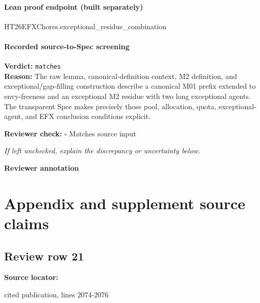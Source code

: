 \documentclass[10pt]{article}
\newcommand{\reviewerbox}{%
  \par\noindent\fbox{\parbox{0.96\linewidth}{\rule{0pt}{0.38in}}}\par
}
\newcommand{\reviewmatch}[1]{%
  \par\noindent\textbf{Reviewer check:} $\square$\; #1\par
  \noindent\emph{If left unchecked, explain the discrepancy or uncertainty below.}\par
}
\begin{document}
\paragraph{Lean proof endpoint (built separately)}\begin{ReviewVerbatim}
HT26EFXChores.exceptional_residue_combination
\end{ReviewVerbatim}

\paragraph{Recorded source-to-Spec screening}
\textbf{Verdict:} \texttt{matches}
\\
\textbf{Reason:} The raw lemma, canonical-definition context, M2 definition, and exceptional/gap-filling construction describe a canonical M01 prefix extended to envy-freeness and an exceptional M2 residue with two long exceptional agents. The transparent Spec makes precisely those pool, allocation, quota, exceptional-agent, and EFX conclusion conditions explicit.
\reviewmatch{Matches source input}
\noindent\textbf{Reviewer annotation}\par
\reviewerbox
\clearpage
\hypertarget{source-claim-bf31a0d3fb856868}{}
\hypertarget{source-section-1743f0a28d68d6cc}{}
\section*{Appendix and supplement source claims}
\subsection*{Review row 21}
\textbf{Source locator:} {\footnotesize\raggedright cited publication, lines 2074-\allowbreak{}2076\par}
\end{document}

